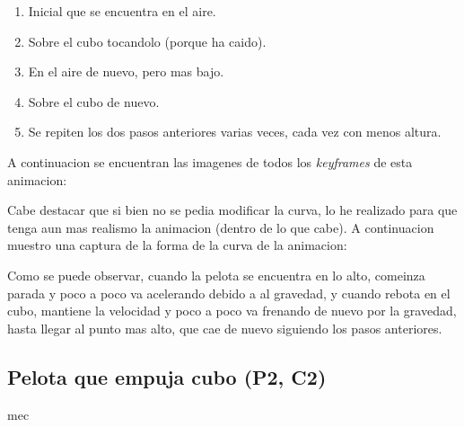 \documentclass{article}
\begin{document}
\begin{enumerate}
    \item Inicial que se encuentra en el aire.
    \item Sobre el cubo tocandolo (porque ha caido).
    \item En el aire de nuevo, pero mas bajo.
    \item Sobre el cubo de nuevo.
    \item Se repiten los dos pasos anteriores varias veces, cada vez con menos altura.
\end{enumerate}

A continuacion se encuentran las imagenes de todos los \textit{keyframes} de esta animacion:



Cabe destacar que si bien no se pedia modificar la curva, lo he realizado para que tenga aun mas realismo la animacion (dentro de lo que cabe). A continuacion muestro una captura de la forma de la curva de la animacion:



Como se puede observar, cuando la pelota se encuentra en lo alto, comeinza parada y poco a poco va acelerando debido a al gravedad, y cuando rebota en el cubo, mantiene la velocidad y poco a poco va frenando de nuevo por la gravedad, hasta llegar al punto mas alto, que cae de nuevo siguiendo los pasos anteriores.

\subsection{Pelota que empuja cubo (P2, C2)}

mec
\end{document}

